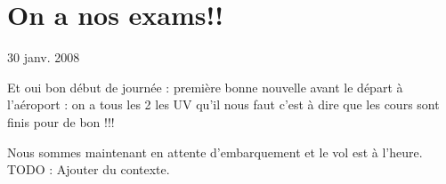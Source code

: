 \section{On a nos exams!!}

30 janv. 2008

\begin{multicols}{2}

Et oui bon début de journée : première bonne nouvelle avant le départ à l'aéroport : on a tous les 2 les UV qu'il nous faut c'est à dire que les cours sont finis pour de bon !!!

Nous sommes maintenant en attente d'embarquement et le vol est à l'heure.
TODO : Ajouter du contexte.

\end{multicols}


